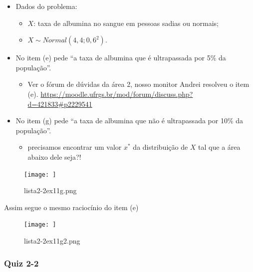 \documentclass[
]{article}
\providecommand{\tightlist}{%
  \setlength{\itemsep}{0pt}\setlength{\parskip}{0pt}}
\begin{document}
\begin{itemize}
\tightlist
\item
  Dados do problema:

  \begin{itemize}
  \tightlist
  \item
    \(X\): taxa de albumina no sangue em pessoas sadias ou normais;
  \item
    \(X \sim Normal(4,4; 0,6^2)\).
  \end{itemize}
\item
  No item (e) pede ``a taxa de albumina que é ultrapassada por 5\% da
  população''.

  \begin{itemize}
  \tightlist
  \item
    Ver o fórum de dúvidas da área 2, nosso monitor Andrei resolveu o
    item (e).
    \url{https://moodle.ufrgs.br/mod/forum/discuss.php?d=421833\#p2229541}
  \end{itemize}
\item
  No item (g) pede ``a taxa de albumina que não é ultrapassada por 10\%
  da população''.

  \begin{itemize}
  \tightlist
  \item
    precisamos encontrar um valor \(x^*\) da distribuição de \(X\) tal
    que a área abaixo dele seja?!
  \end{itemize}
\end{itemize}

\begin{figure}
\centering
\texttt{[image: ]}
\caption{lista2-2ex11g.png}
\end{figure}

Assim segue o mesmo raciocínio do item (e)

\begin{figure}
\centering
\texttt{[image: ]}
\caption{lista2-2ex11g2.png}
\end{figure}

\hypertarget{quiz-2-2}{%
\subsubsection{Quiz 2-2}\label{quiz-2-2}}
\end{document}
